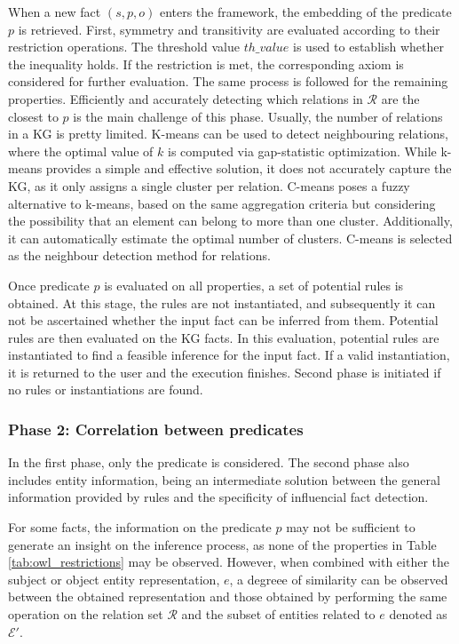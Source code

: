 When a new fact $(s,p,o)$ enters the framework, the embedding of the predicate $p$ is retrieved. First, symmetry and transitivity are evaluated according to their restriction operations. The threshold value $th\_value$ is used to establish whether the inequality holds. If the restriction is met, the corresponding axiom is considered for further evaluation. The same process is followed for the remaining properties. Efficiently and accurately detecting which relations in $\mathcal{R}$ are the closest to $p$ is the main challenge of this phase. Usually, the number of relations in a KG is pretty limited. K-means can be used to detect neighbouring relations, where the optimal value of $k$ is computed via gap-statistic optimization. While k-means provides a simple and effective solution, it does not accurately capture the KG, as it only assigns a single cluster per relation. C-means poses a fuzzy alternative to k-means, based on the same aggregation criteria but considering the possibility that an element can belong to more than one cluster. Additionally, it can automatically estimate the optimal number of clusters. C-means is selected as the neighbour detection method for relations.

Once predicate $p$ is evaluated on all properties, a set of potential rules is obtained. At this stage, the rules are not instantiated, and subsequently it can not be ascertained whether the input fact can be inferred from them. Potential rules are then evaluated on the KG facts. In this evaluation, potential rules are instantiated to find a feasible inference for the input fact. If a valid instantiation, it is returned to the user and the execution finishes. Second phase is initiated if no rules or instantiations are found.

\subsubsection*{Phase 2: Correlation between predicates}
In the first phase, only the predicate is considered. The second phase also includes entity information, being an intermediate solution between the general information provided by rules and the specificity of influencial fact detection. 

For some facts, the information on the predicate $p$ may not be sufficient to generate an insight on the inference process, as none of the properties in Table \ref{tab:owl_restrictions} may be observed. However, when combined with either the subject or object entity representation, $e$, a degreee of similarity can be observed between the obtained representation and those obtained by performing the same operation on the relation set $\mathcal{R}$ and the subset of entities related to $e$ denoted as $\mathcal{E}'$.

